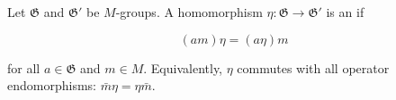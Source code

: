 Let $\mathfrak{G}$ and $\mathfrak{G}'$ be $M$-groups. A homomorphism $\eta : \mathfrak{G} \to \mathfrak{G}'$ is an  if

$$(am)\eta = (a\eta)m$$

for all $a \in \mathfrak{G}$ and $m \in M$. Equivalently, $\eta$ commutes with all operator endomorphisms: $\bar{m} \eta = \eta \bar{m}$.
